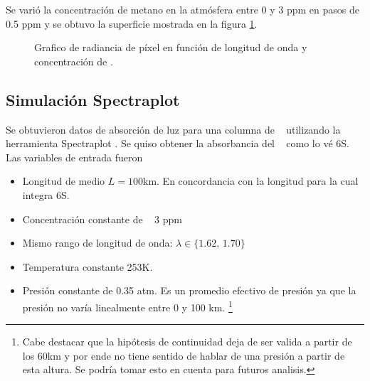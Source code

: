 \documentclass[titlepage,11pt]{article}
\begin{document}
Se varió la concentración de metano en la atmósfera entre 0 y 3 ppm en pasos de 0.5 ppm y se obtuvo la superficie mostrada en la figura \ref{fig:ch4IrrVsPpm}.


\begin{figure}[htb!]
\centering
\pgfplotsset{colormap/jet}
	\caption{Grafico  de radiancia de píxel en función de longitud de onda y concentración de \metano.}
	\label{fig:ch4IrrVsPpm}
\end{figure}

\subsection{Simulaci\'on Spectraplot}
Se obtuvieron datos de absorción de luz para una columna de \metano~ utilizando la herramienta Spectraplot \cite{goldenstein2017spectraplot}. Se quiso obtener la absorbancia del \metano~ como lo vé 6S. Las variables de entrada fueron

\begin{itemize}
    \item Longitud de medio $L=100$km. En concordancia con la longitud para la cual integra 6S.
    \item Concentración constante de \metano~ 3 ppm
    \item Mismo rango de longitud de onda: $\lambda \in \{1.62,\,1.70\}$
    \item Temperatura constante 253K.
    \item Presión constante de 0.35 atm. Es un promedio efectivo de presión ya que la presión no varía linealmente entre 0 y 100 km. \footnote{Cabe destacar que la hipótesis de continuidad deja de ser valida a partir de los 60km y por ende no tiene sentido de hablar de una presión a partir de esta altura. Se podría tomar esto en cuenta para futuros analisis.}
\end{itemize}
\end{document}
